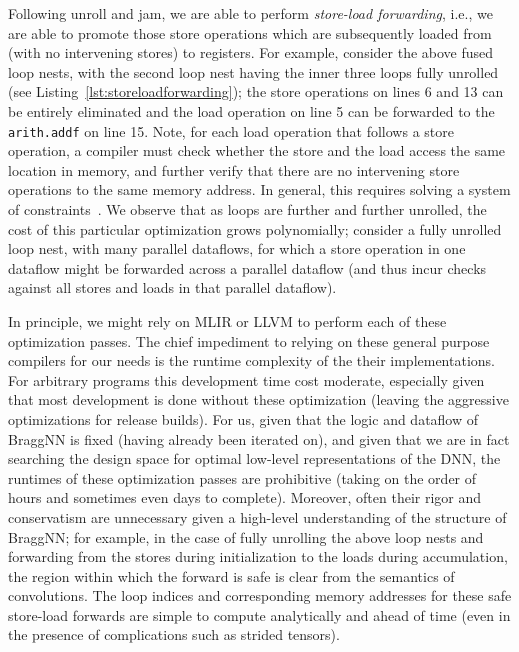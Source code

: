 Following unroll and jam, we are able to perform \emph{store-load forwarding}, i.e., we are able to promote those store operations which are subsequently loaded from (with no intervening stores) to registers.
For example, consider the above fused loop nests, with the second loop nest having the inner three loops fully unrolled (see Listing~\ref{lst:storeloadforwarding}); the store operations on lines 6 and 13 can be entirely eliminated and the load operation on line 5 can be forwarded to the \texttt{arith.addf} on line 15.
Note, for each load operation that follows a store operation, a compiler must check whether the store and the load access the same location in memory, and further verify that there are no intervening store operations to the same memory address.
In general, this requires solving a system of constraints~\cite{10.2307/2322281}.
We observe that as loops are further and further unrolled, the cost of this particular optimization grows polynomially; consider a fully unrolled loop nest, with many parallel dataflows, for which a store operation in one dataflow might be forwarded across a parallel dataflow (and thus incur checks against all stores and loads in that parallel dataflow).

In principle, we might rely on MLIR or LLVM to perform each of these optimization passes.
The chief impediment to relying on these general purpose compilers for our needs is the runtime complexity of the their implementations.
For arbitrary programs this development time cost moderate, especially given that most development is done without these optimization (leaving the aggressive optimizations for release builds).
For us, given that the logic and dataflow of BraggNN is fixed (having already been iterated on), and given that we are in fact searching the design space for optimal low-level representations of the DNN, the runtimes of these optimization passes are prohibitive (taking on the order of hours and sometimes even days to complete).
Moreover, often their rigor and conservatism are unnecessary given a high-level understanding of the structure of BraggNN; for example, in the case of fully unrolling the above loop nests and forwarding from the stores during initialization to the loads during accumulation, the region within which the forward is safe is clear from the semantics of convolutions.
The loop indices and corresponding memory addresses for these safe store-load forwards are simple to compute analytically and ahead of time (even in the presence of complications such as strided tensors).

